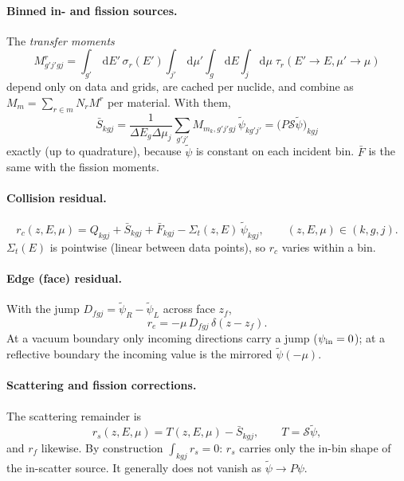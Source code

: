 \documentclass[11pt]{article}
\newcommand{\dd}{\,\mathrm{d}}
\newcommand{\tpsi}{\tilde\psi}
\newcommand{\Sbar}{\bar S}
\newcommand{\Sigt}{\Sigma_t}
\begin{document}
\paragraph{Binned in- and fission sources.} The \emph{transfer moments}
\begin{equation}
  M^{r}_{g'j'gj}=\int_{g'}\!\dd E'\,\sigma_r(E')\int_{j'}\!\dd\mu'\int_g\!\dd E\int_j\!\dd\mu\;
  \tau_r(E'\!\to E,\mu'\!\to\mu)
  \label{eq:moments}
\end{equation}
depend only on data and grids, are cached per nuclide, and combine as
$M_m=\sum_{r\in m}N_r M^r$ per material. With them,
\begin{equation}
  \Sbar_{kgj}=\frac{1}{\Delta E_g\Delta\mu_j}\sum_{g'j'}M_{m_k,g'j'gj}\,\tpsi_{kg'j'}
  =\big(P\mathcal S\tpsi\big)_{kgj}
\end{equation}
exactly (up to quadrature), because $\tpsi$ is constant on each incident bin. $\bar F$
is the same with the fission moments.

\paragraph{Collision residual.}
\begin{equation}
  r_c(z,E,\mu)=Q_{kgj}+\Sbar_{kgj}+\bar F_{kgj}-\Sigt(z,E)\,\tpsi_{kgj},
  \qquad (z,E,\mu)\in(k,g,j).
  \label{eq:rc}
\end{equation}
$\Sigt(E)$ is pointwise (linear between data points), so $r_c$ varies within a bin.

\paragraph{Edge (face) residual.} With the jump $D_{fgj}=\tpsi_{R}-\tpsi_{L}$ across
face $z_f$,
\begin{equation}
  r_e=-\mu\,D_{fgj}\,\delta(z-z_f).
\end{equation}
At a vacuum boundary only incoming directions carry a jump ($\psi_{\rm in}=0$); at a
reflective boundary the incoming value is the mirrored $\tpsi(-\mu)$.

\paragraph{Scattering and fission corrections.} The scattering remainder is
\begin{equation}
  r_s(z,E,\mu)=T(z,E,\mu)-\Sbar_{kgj},\qquad T=\mathcal S\tpsi ,
  \label{eq:rs}
\end{equation}
and $r_f$ likewise. By construction $\int_{kgj} r_s=0$: $r_s$ carries only the in-bin
shape of the in-scatter source. It generally does not vanish as $\tpsi\to P\psi$.
\end{document}
